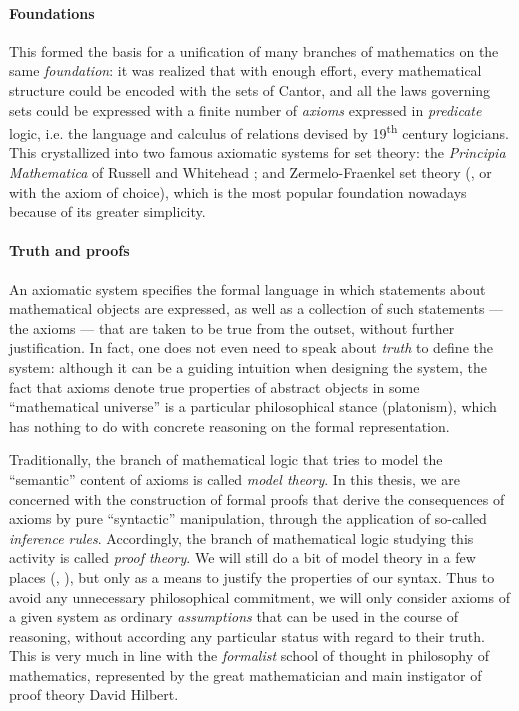 \paragraph{Foundations}

This formed the basis for a unification of many branches of mathematics on the
same \emph{foundation}: it was realized that with enough effort, every
mathematical structure could be encoded with the sets of Cantor, and all the
laws governing sets could be expressed with a finite number of \emph{axioms}
expressed in \emph{predicate} logic, i.e. the language and calculus of relations
devised by 19\textsuperscript{th} century logicians. This crystallized into two
famous axiomatic systems for set theory: the \textit{Principia Mathematica} of
Russell and Whitehead ; and Zermelo-Fraenkel set theory
(, or  with the axiom of choice), which is the most popular
foundation nowadays because of its greater simplicity.

\paragraph{Truth and proofs}

An axiomatic system specifies the formal language in which statements about
mathematical objects are expressed, as well as a collection of such statements
--- the axioms --- that are taken to be true from the outset, without further
justification. In fact, one does not even need to speak about \emph{truth} to
define the system: although it can be a guiding intuition when designing the
system, the fact that axioms denote true properties of abstract objects in some
``mathematical universe'' is a particular philosophical stance (platonism),
which has nothing to do with concrete reasoning on the formal representation.

Traditionally, the branch of mathematical logic that tries to model the
``semantic'' content of axioms is called \emph{model theory}. In this thesis, we
are concerned with the construction of formal proofs that derive the
consequences of axioms by pure ``syntactic'' manipulation, through the
application of so-called \emph{inference rules}. Accordingly, the branch of
mathematical logic studying this activity is called \emph{proof theory}. We will
still do a bit of model theory in a few places (,
), but only as a means to justify the properties of our
syntax. Thus to avoid any unnecessary philosophical commitment, we will only
consider axioms of a given system as ordinary \emph{assumptions} that can be
used in the course of reasoning, without according any particular status with
regard to their truth. This is very much in line with the \emph{formalist}
school of thought in philosophy of mathematics, represented by the great
mathematician and main instigator of proof theory David Hilbert.


